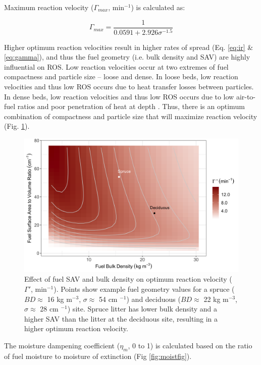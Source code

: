 \documentclass[a4paper, 12pt] {report}
\begin{document}
Maximum reaction velocity ($\Gamma_{max}$, min$^{-1}$) is calculated as:

\begin{equation} 
	\Gamma_{max} = \frac{1}{0.0591 + 2.926\sigma^{-1.5}}
\end{equation}

Higher optimum reaction velocities result in higher rates of spread (Eq. \ref{eq:ir} \& \ref{eq:gamma}), and thus the fuel geometry (i.e. bulk density and SAV) are highly influential on ROS. Low reaction velocities occur at two extremes of fuel compactness and particle size -- loose and dense. In loose beds, low reaction velocities and thus low ROS occurs due to heat transfer losses between particles. In dense beds, low reaction velocities and thus low ROS occurs due to low air-to-fuel ratios and poor penetration of heat at depth \cite{johnsonFireVegetationDynamics1992}. Thus, there is an optimum combination of compactness and particle size that will maximize reaction velocity (Fig. \ref{fig:velocity}).

\begin{figure}
	\includegraphics[width=\linewidth]{figures/rvol.png}
	\caption{Effect of fuel SAV and bulk density on optimum reaction velocity ($\Gamma '$, min$^{-1}$). Points show example fuel geometry values for a spruce ($BD \approx$ 16 kg m$^{-3}$, $\sigma \approx$ 54 cm $^{-1}$) and deciduous ($BD \approx$ 22 kg m$^{-3}$, $\sigma \approx$ 28 cm $^{-1}$) site. Spruce litter has lower bulk density and a higher SAV than the litter at the deciduous site, resulting in a higher optimum reaction velocity.}
	\label{fig:velocity}
\end{figure}

The moisture dampening coefficient ($\eta_m$, 0 to 1) is calculated based on the ratio of fuel moisture to moisture of extinction \cite{pyneIntroductionWildlandFire1996} (Fig \ref{fig:moistfig}).
\end{document}

